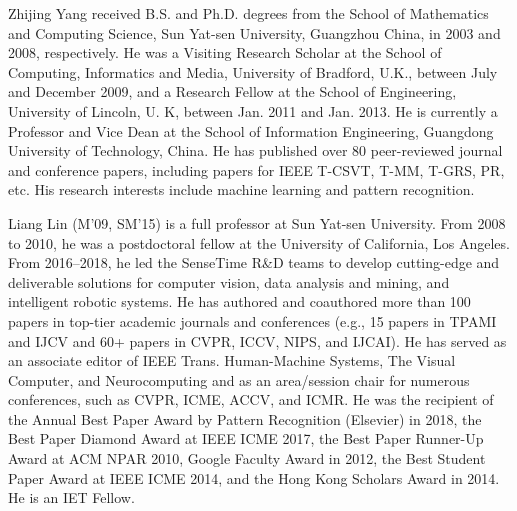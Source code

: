 \documentclass[lettersize,journal]{IEEEtran}
\begin{document}
\begin{IEEEbiography}{Zhijing Yang} received B.S. and Ph.D. degrees from the School of Mathematics and Computing Science, Sun Yat-sen University, Guangzhou China, in 2003 and 2008, respectively. He was a Visiting Research Scholar at the School of Computing, Informatics and Media, University of Bradford, U.K., between July and December 2009, and a Research Fellow at the School of Engineering, University of Lincoln, U. K, between Jan. 2011 and Jan. 2013. He is currently a Professor and Vice Dean at the School of Information Engineering, Guangdong University of Technology, China. He has published over 80 peer-reviewed journal and conference papers, including papers for IEEE T-CSVT, T-MM, T-GRS, PR, etc. His research interests include machine learning and pattern recognition.
\end{IEEEbiography}

\begin{IEEEbiography}{Liang Lin} (M'09, SM'15) is a full professor at Sun Yat-sen University. From 2008 to 2010, he was a postdoctoral fellow at the University of California, Los Angeles. From 2016--2018, he led the SenseTime R\&D teams to develop cutting-edge and deliverable solutions for computer vision, data analysis and mining, and intelligent robotic systems. He has authored and coauthored more than 100 papers in top-tier academic journals and conferences (e.g., 15 papers in TPAMI and IJCV and 60+ papers in CVPR, ICCV, NIPS, and IJCAI). He has served as an associate editor of IEEE Trans. Human-Machine Systems, The Visual Computer, and Neurocomputing and as an area/session chair for numerous conferences, such as CVPR, ICME, ACCV, and ICMR. He was the recipient of the Annual Best Paper Award by Pattern Recognition (Elsevier) in 2018, the Best Paper Diamond Award at IEEE ICME 2017, the Best Paper Runner-Up Award at ACM NPAR 2010, Google Faculty Award in 2012, the Best Student Paper Award at IEEE ICME 2014, and the Hong Kong Scholars Award in 2014. He is an IET Fellow. \end{IEEEbiography}
\end{document}
